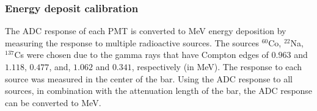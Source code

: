 \documentclass[3p,final,twocolumn]{elsarticle}
\begin{document}
\subsubsection{Energy deposit calibration}
The ADC response of each PMT is converted to \si{\mega\electronvolt} energy deposition by measuring the response to 
multiple radioactive sources. The sources $^{60}$Co, $^{22}$Na, $^{137}$Cs were chosen due to the gamma rays that have 
Compton edges of $0.963$ and $1.118$, $0.477$, and, $1.062$ and $0.341$, respectively (in \si{\mega\electronvolt}). The 
response to each source was measured in the center of the bar. Using the ADC response to all sources, in combination with the 
attenuation length of the bar, the ADC response can be converted to \si{\mega\electronvolt}.
\end{document}
